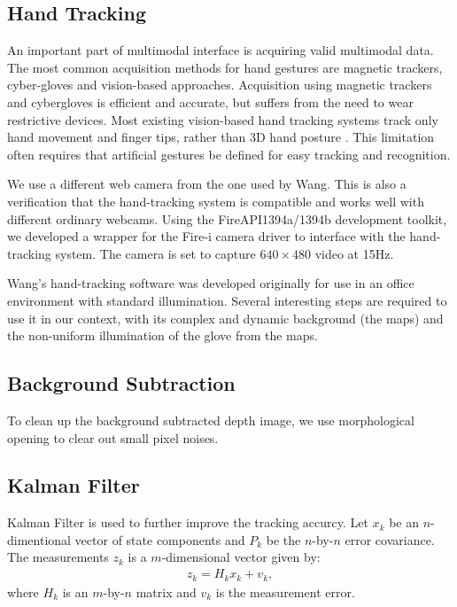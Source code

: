 \subsection{Hand Tracking}
An important part of multimodal interface is acquiring valid multimodal data. The most common acquisition methods for hand gestures are magnetic trackers, cyber-gloves and vision-based approaches. Acquisition using magnetic trackers and cybergloves is efficient and accurate, but suffers from the need to wear restrictive devices. Most existing vision-based hand tracking systems track only hand movement and finger tips, rather than 3D hand posture \cite{Demirdjian03}\cite{Oka02}\cite{Rauschert02}. This limitation often requires that artificial gestures be defined for easy tracking and recognition.  

We use a different web camera from the one used by Wang. This is also a verification that the hand-tracking system is compatible and works well with different ordinary webcams. Using the FireAPI\texttrademark 1394a/1394b development toolkit, we developed a wrapper for the Fire-i camera driver to interface with the hand-tracking system. The camera is set to capture $640 \times 480$ video at 15Hz.  

Wang's hand-tracking software was developed originally for use in an office environment with standard illumination. Several interesting steps are required to use it in our context, with its complex and dynamic background (the maps) and the non-uniform illumination of the glove from the maps. 

\subsection{Background Subtraction}
To clean up the background subtracted depth image, we use morphological opening
to clear out small pixel noises. 

\subsection{Kalman Filter}
Kalman Filter is used to further improve the tracking accurcy.
Let $x_k$ be an $n$-dimentional vector of state components and $P_k$ be the
$n$-by-$n$ error covariance. The measurements $z_k$ is a $m$-dimensional
vector given by:
\begin{align*}
z_k = H_kx_k + v_k,
\end{align*}
where $H_k$ is an $m$-by-$n$ matrix and $v_k$ is the measurement error.

